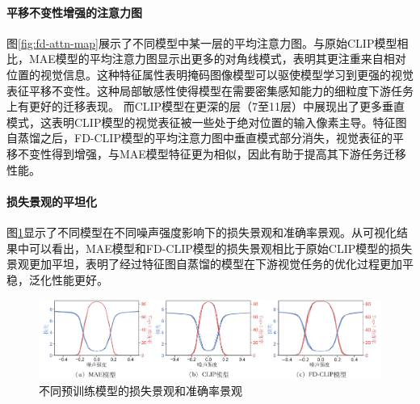 \paragraph{平移不变性增强的注意力图} 图\ref{fig:fd-attn-map}展示了不同模型中某一层的平均注意力图。与原始CLIP模型相比，MAE模型的平均注意力图显示出更多的对角线模式，表明其更注重来自相对位置的视觉信息。这种特征属性表明掩码图像模型可以驱使模型学习到更强的视觉表征平移不变性。这种局部敏感性使得模型在需要密集感知能力的细粒度下游任务上有更好的迁移表现。
而CLIP模型在更深的层（7至11层）中展现出了更多垂直模式，这表明CLIP模型的视觉表征被一些处于绝对位置的输入像素主导。特征图自蒸馏之后，FD-CLIP模型的平均注意力图中垂直模式部分消失，视觉表征的平移不变性得到增强，与MAE模型特征更为相似，因此有助于提高其下游任务迁移性能。

\paragraph{损失景观的平坦化} 图\ref{fig:fd-loss-landscape}显示了不同模型在不同噪声强度影响下的损失景观和准确率景观\cite{li2018visualizing}。从可视化结果中可以看出，MAE模型和FD-CLIP模型的损失景观相比于原始CLIP模型的损失景观更加平坦，表明了经过特征图自蒸馏的模型在下游视觉任务的优化过程更加平稳，泛化性能更好。%

\begin{figure}
  \centering
  \includegraphics[width=1.0\linewidth]{figures/fd-loss-landscape.pdf}
  \caption{不同预训练模型的损失景观和准确率景观}
  \label{fig:fd-loss-landscape}
\end{figure}




